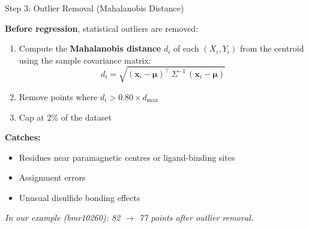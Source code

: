 \documentclass[aspectratio=169,11pt]{beamer}
\begin{document}
\begin{frame}[shrink=8]{Step 3: Outlier Removal (Mahalanobis Distance)}

\textbf{Before regression}, statistical outliers are removed:

\medskip
\begin{enumerate}
  \item Compute the \textbf{Mahalanobis distance} $d_i$ of each $(X_i, Y_i)$ from the centroid using the sample covariance matrix:
  \[
    d_i = \sqrt{(\mathbf{x}_i - \boldsymbol{\mu})^\top \, \Sigma^{-1} \, (\mathbf{x}_i - \boldsymbol{\mu})}
  \]

  \item Remove points where $d_i > 0.80 \times d_{\max}$

  \item Cap at 2\% of the dataset
\end{enumerate}

\bigskip
\textbf{Catches:}
\begin{itemize}
  \item Residues near paramagnetic centres or ligand-binding sites
  \item Assignment errors
  \item Unusual disulfide bonding effects
\end{itemize}

\medskip
\textit{In our example (bmr10260): 82 $\to$ 77 points after outlier removal.}
\end{frame}
\end{document}
